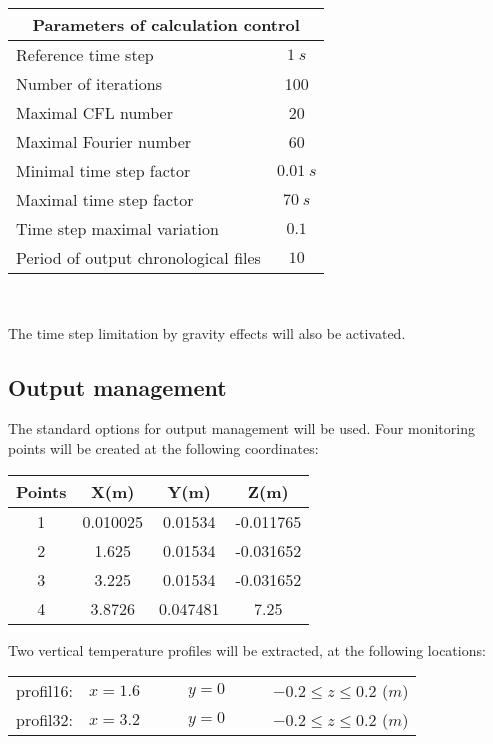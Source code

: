 \begin{center}
\begin{tabular}{|l|c|}
\hline
\multicolumn{2}{|c|}{Parameters of calculation control} \\
\hline
Reference time step & $1\ s $ \\
\hline
Number of iterations & 100 \\
\hline
Maximal CFL number & 20 \\
\hline
Maximal Fourier number & 60 \\
\hline
Minimal time step factor & $0.01\ s$ \\
\hline
Maximal time step factor & $70\ s$ \\
\hline
Time step maximal variation & $0.1$ \\
\hline
Period of output chronological files & $10$ \\
\hline
\end{tabular}\\
\end{center}

The time step limitation by gravity effects will also be activated.


        \subsection{Output management}
The standard options for output management will be used. Four monitoring points
will be created at the following coordinates:

\begin{center}
\begin{tabular}{|c|c|c|c|}
\hline
Points & X(m) & Y(m) & Z(m)\\
\hline
1 & 0.010025 & 0.01534 & -0.011765 \\
\hline
2 & 1.625 & 0.01534 & -0.031652 \\
\hline
3 & 3.225 & 0.01534 & -0.031652 \\
\hline
4 & 3.8726 & 0.047481 & 7.25 \\
\hline
\end{tabular}
\end{center}


Two vertical temperature profiles will be extracted, at the following locations:\\
\begin{tabular}{llll}
profil16: & $x=1.6\qquad$ & $y=0\qquad$ & $-0.2 \leqslant z \leqslant 0.2$ ($m$)\\
profil32: & $x=3.2\qquad$ & $y=0\qquad$ & $-0.2 \leqslant z \leqslant 0.2$ ($m$)
\end{tabular}


